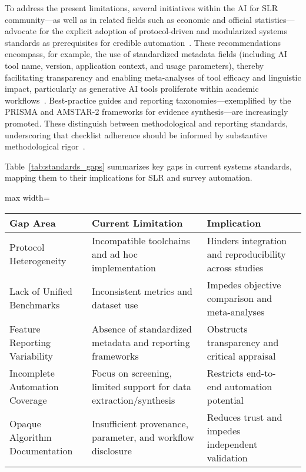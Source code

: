 \documentclass[sigconf]{acmart}
\begin{document}
To address the present limitations, several initiatives within the AI for SLR community—as well as in related fields such as economic and official statistics—advocate for the explicit adoption of protocol-driven and modularized systems standards as prerequisites for credible automation~\cite{ref30,ref37,ref43,ref51,ref61,ref89}. These recommendations encompass, for example, the use of standardized metadata fields (including AI tool name, version, application context, and usage parameters), thereby facilitating transparency and enabling meta-analyses of tool efficacy and linguistic impact, particularly as generative AI tools proliferate within academic workflows~\cite{ref98,ref106}. Best-practice guides and reporting taxonomies—exemplified by the PRISMA and AMSTAR-2 frameworks for evidence synthesis—are increasingly promoted. These distinguish between methodological and reporting standards, underscoring that checklist adherence should be informed by substantive methodological rigor~\cite{ref43,ref63,ref86,ref106}.

Table~\ref{tab:standards_gaps} summarizes key gaps in current systems standards, mapping them to their implications for SLR and survey automation.

\begin{table*}[htbp]
\centering
\caption{Key Gaps in System Standards and Their Implications for SLR Automation}
\label{tab:standards_gaps}
\begin{adjustbox}{max width=\textwidth}
\begin{tabular}{@{}llll@{}}
\toprule
Gap Area & Current Limitation & Implication &  \\
\midrule
Protocol Heterogeneity & Incompatible toolchains and ad hoc implementation & Hinders integration and reproducibility across studies &  \\
Lack of Unified Benchmarks & Inconsistent metrics and dataset use & Impedes objective comparison and meta-analyses &  \\
Feature Reporting Variability & Absence of standardized metadata and reporting frameworks & Obstructs transparency and critical appraisal &  \\
Incomplete Automation Coverage & Focus on screening, limited support for data extraction/synthesis & Restricts end-to-end automation potential &  \\
Opaque Algorithm Documentation & Insufficient provenance, parameter, and workflow disclosure & Reduces trust and impedes independent validation &  \\
\bottomrule
\end{tabular}
\end{adjustbox}
\end{table*}
\end{document}
